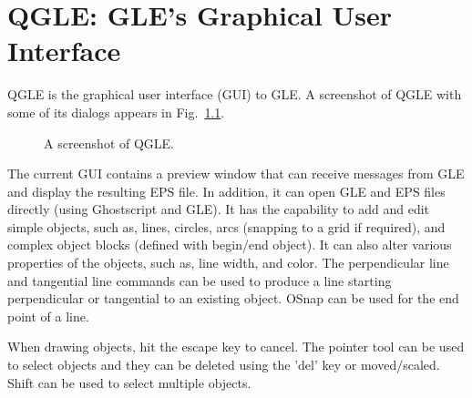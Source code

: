 \chapter{QGLE: GLE's Graphical User Interface}
\label{QGLE:chap}

QGLE is the graphical user interface (GUI) to GLE. A screenshot of QGLE with some of its dialogs appears in Fig.~\ref{fig:qgle}.

\begin{figure}
\caption{\label{fig:qgle}A screenshot of QGLE.}
\end{figure}

The current GUI contains a preview window that can receive messages from GLE and display the resulting EPS file. In addition, it can open GLE and EPS files directly (using Ghostscript and GLE).  It has the capability to add and edit simple objects, such as, lines, circles, arcs (snapping to a grid if required), and complex object blocks (defined with begin/end object). It can also alter various properties of the objects, such as, line width, and color. The perpendicular line and tangential line commands can be used to produce a line starting perpendicular or tangential to an existing object. OSnap can be used for the end point of a line.

\vspace{0.5cm}
When drawing objects, hit the escape key to cancel.  The pointer tool can be used to select objects and they can be deleted using the 'del' key or moved/scaled. Shift can be used to select multiple objects.

